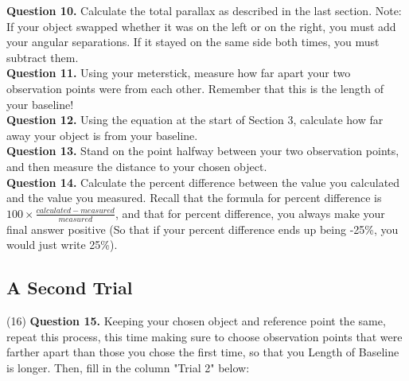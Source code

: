 \documentclass[11pt]{article}
\begin{document}
\textbf{Question 10.} Calculate the total parallax as described in the last section. Note: If your object swapped whether it was on the left or on the right, you must add your angular separations. If it stayed on the same side both times, you must subtract them.\\

\textbf{Question 11.} Using your meterstick, measure how far apart your two observation points were from each other. Remember that this is the length of your baseline!\\

\textbf{Question 12.} Using the equation at the start of Section 3, calculate how far away your object is from your baseline.\\

\textbf{Question 13.} Stand on the point halfway between your two observation points, and then measure the distance to your chosen object.\\

\textbf{Question 14.} Calculate the percent difference between the value you calculated and the value you measured. Recall that the formula for percent difference is $100\times\frac{calculated-measured}{measured}$, and that for percent difference, you always make your final answer positive (So that if your percent difference ends up being -25\%, you would just write 25\%).

\newpage

\subsection*{A Second Trial}

(16) \textbf{Question 15.} Keeping your chosen object and reference point the same, repeat this process, this time making sure to choose observation points that were farther apart than those you chose the first time, so that you Length of Baseline is longer. Then, fill in the column "Trial 2" below: \\
\end{document}
